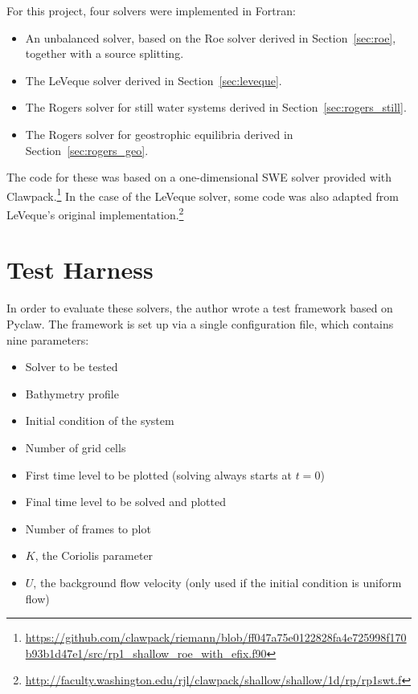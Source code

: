 For this project, four solvers were implemented in Fortran:

\begin{itemize}
  \item An unbalanced solver, based on the Roe solver derived in Section~\ref{sec:roe}, together with a source splitting.
  \item The LeVeque solver derived in Section~\ref{sec:leveque}.
  \item The Rogers solver for still water systems derived in Section~\ref{sec:rogers_still}.
  \item The Rogers solver for geostrophic equilibria derived in Section~\ref{sec:rogers_geo}.
\end{itemize}

The code for these was based on a one-dimensional SWE solver provided with Clawpack.\footnote{\url{https://github.com/clawpack/riemann/blob/ff047a75e0122828fa4e725998f170b93b1d47e1/src/rp1_shallow_roe_with_efix.f90}} In the case of the LeVeque solver, some code was also adapted from LeVeque's original implementation.\footnote{\url{http://faculty.washington.edu/rjl/clawpack/shallow/shallow/1d/rp/rp1swt.f}}

\section{Test Harness}

In order to evaluate these solvers, the author wrote a test framework based on Pyclaw. The framework is set up via a single configuration file, which contains nine parameters:

\begin{itemize}
  \item Solver to be tested
  \item Bathymetry profile
  \item Initial condition of the system
  \item Number of grid cells
  \item First time level to be plotted (solving always starts at $t = 0$)
  \item Final time level to be solved and plotted
  \item Number of frames to plot
  \item $K$, the Coriolis parameter
  \item $U$, the background flow velocity (only used if the initial condition is uniform flow)
\end{itemize}


